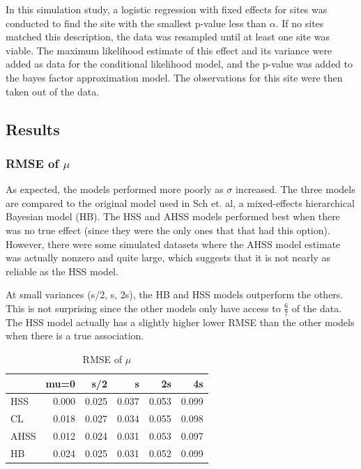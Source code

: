 \documentclass[AMA,STIX1COL]{WileyNJD-v2}\usepackage[]{graphicx}\usepackage[]{color}
\newenvironment{knitrout}{}{} %
\begin{document}
In this simulation study, a logistic regression with fixed effects for sites was conducted to find the site with the smallest p-value less than $\alpha$. If no sites matched this description, the data was resampled until at least one site was viable. The maximum likelihood estimate of this effect and its variance were added as data for the conditional likelihood model, and the p-value was added to the bayes factor approximation model.  The observations for this site were then taken out of the data.

\subsection{Results}











\subsubsection{RMSE of $\mu$}

As expected, the models performed more poorly as $\sigma$ increased. The three models are compared to the original model used in Sch et. al, a mixed-effects hierarchical Bayesian model (HB). The HSS and AHSS models performed best when there was no true effect (since they were the only ones that that had this option). However, there were some simulated datasets where the AHSS model estimate was actually nonzero and quite large, which suggests that it is not nearly as reliable as the HSS model.


At small variances (s/2, s,  2s), the HB and HSS models outperform the others. This is not surprising since the other models only have access to $\frac{6}{7}$ of the data. The HSS model actually has a slightly higher lower RMSE than the other models when there is a true association.




\begin{knitrout}
\color{fgcolor}\begin{table}

\caption{\label{tab:unnamed-chunk-20}RMSE of $\mu$}
\centering
\begin{tabular}[t]{l|r|r|r|r|r}
\hline
  & mu=0 & s/2 & s & 2s & 4s\\
\hline
HSS & 0.000 & 0.025 & 0.037 & 0.053 & 0.099\\
\hline
CL & 0.018 & 0.027 & 0.034 & 0.055 & 0.098\\
\hline
AHSS & 0.012 & 0.024 & 0.031 & 0.053 & 0.097\\
\hline
HB & 0.024 & 0.025 & 0.031 & 0.052 & 0.099\\
\hline
\end{tabular}
\end{table}


\end{knitrout}
\end{document}

